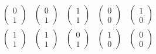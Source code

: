 \[\begin{array}{c|cccc}
\begin{pmatrix}
0\\ 1\end{pmatrix} & \begin{pmatrix}0 \\ 1\end{pmatrix} & \begin{pmatrix}1\\ 1\end{pmatrix} & \begin{pmatrix}0\\ 0\end{pmatrix} & \begin{pmatrix}1\\ 0 \end{pmatrix} \\ \begin{pmatrix}1\\ 1\end{pmatrix} & \begin{pmatrix}1 \\ 1\end{pmatrix} & \begin{pmatrix}0 \\ 1\end{pmatrix} & \begin{pmatrix}1\\ 0\end{pmatrix} & \begin{pmatrix}0\\ 0\end{pmatrix}\end{array} \]

